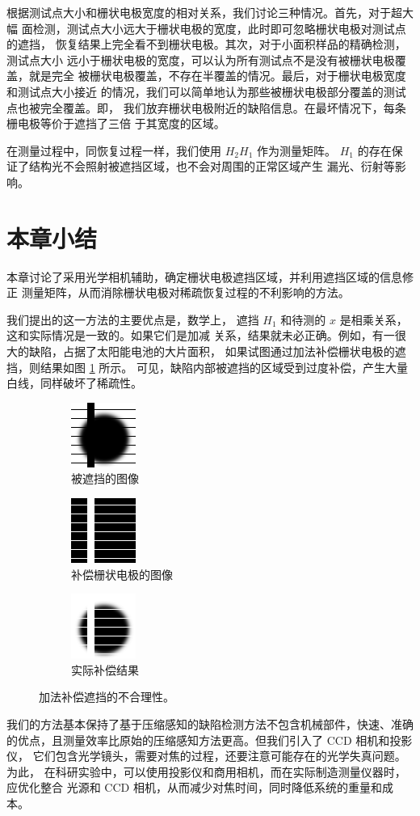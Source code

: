 根据测试点大小和栅状电极宽度的相对关系，我们讨论三种情况。首先，对于超大幅
面检测，测试点大小远大于栅状电极的宽度，此时即可忽略栅状电极对测试点的遮挡，
恢复结果上完全看不到栅状电极。其次，对于小面积样品的精确检测，测试点大小
远小于栅状电极的宽度，可以认为所有测试点不是没有被栅状电极覆盖，就是完全
被栅状电极覆盖，不存在半覆盖的情况。最后，对于栅状电极宽度和测试点大小接近
的情况，我们可以简单地认为那些被栅状电极部分覆盖的测试点也被完全覆盖。即，
我们放弃栅状电极附近的缺陷信息。在最坏情况下，每条栅电极等价于遮挡了三倍
于其宽度的区域。

在测量过程中，同恢复过程一样，我们使用 $H_2 H_1$ 作为测量矩阵。 
$H_1$ 的存在保证了结构光不会照射被遮挡区域，也不会对周围的正常区域产生
漏光、衍射等影响。

\section{本章小结}

本章讨论了采用光学相机辅助，确定栅状电极遮挡区域，并利用遮挡区域的信息修正
测量矩阵，从而消除栅状电极对稀疏恢复过程的不利影响的方法。

我们提出的这一方法的主要优点是，数学上，
遮挡 $H_1$ 和待测的 $x$ 是相乘关系，这和实际情况是一致的。如果它们是加减
关系，结果就未必正确。例如，有一很大的缺陷，占据了太阳能电池的大片面积，
如果试图通过加法补偿栅状电极的遮挡，则结果如图 \ref{fig:addmask} 所示。
可见，缺陷内部被遮挡的区域受到过度补偿，产生大量白线，同样破坏了稀疏性。

\begin{figure}[h]
\centering
\begin{subfigure}[h]{1.1in}
\includegraphics{Figure/add1.png}
\caption{被遮挡的图像}
\end{subfigure}
\begin{subfigure}[h]{1.1in}
\includegraphics{Figure/add2.png}
\caption{补偿栅状电极的图像}
\end{subfigure}
\begin{subfigure}[h]{1.1in}
\includegraphics{Figure/add3.png}
\caption{实际补偿结果}
\end{subfigure}
\caption{加法补偿遮挡的不合理性。}
\label{fig:addmask}
\end{figure}

我们的方法基本保持了基于压缩感知的缺陷检测方法不包含机械部件，快速、准确
的优点，且测量效率比原始的压缩感知方法更高。但我们引入了 CCD 相机和投影仪，
它们包含光学镜头，需要对焦的过程，还要注意可能存在的光学失真问题。为此，
在科研实验中，可以使用投影仪和商用相机，而在实际制造测量仪器时，应优化整合
光源和 CCD 相机，从而减少对焦时间，同时降低系统的重量和成本。
